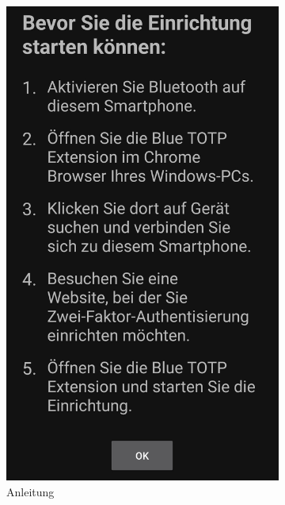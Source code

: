 \begin{figure}[h]
\begin{subfigure}{.23\textwidth}
        \includegraphics[width=.95\linewidth]{figures/impl/screenshot_app_anleitung.jpg}
        \caption{Anleitung}
        \label{fig: blue totp app screenshot anleitung}
    \end{subfigure}
    \begin{subfigure}{.23\textwidth}
        \centering

\end{subfigure}
\end{figure}
